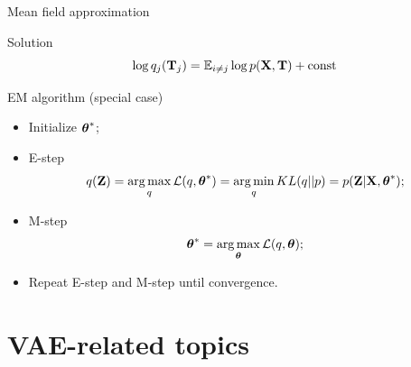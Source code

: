 \documentclass{beamer}
\begin{document}
\begin{frame}{Mean field approximation}
    \begin{block}{Solution}
    \[
        \log q_j(\mathbf{T}_j) = \mathbb{E}_{i \neq j} \log p(\mathbf{X}, \mathbf{T}) + \text{const}
    \]
    \end{block}

	\begin{block}{EM algorithm (special case)}
	\begin{itemize}
		\item Initialize $\boldsymbol{\theta}^*$;
		\item E-step
		\[
			q(\mathbf{Z}) = \operatorname*{arg\,max}_q \mathcal{L} (q, \boldsymbol{\theta}^*) = \operatorname*{arg\,min}_q KL(q || p) =
			 p(\mathbf{Z}| \mathbf{X}, \boldsymbol{\theta}^*);
		\]
		\item M-step
		\[
			\boldsymbol{\theta}^* = \operatorname*{arg\,max}_{\boldsymbol{\theta}} \mathcal{L} (q, \boldsymbol{\theta});
		\]
		\item Repeat E-step and M-step until convergence.
	\end{itemize}
	\end{block}
\end{frame}
\section{VAE-related topics}
\end{document}
